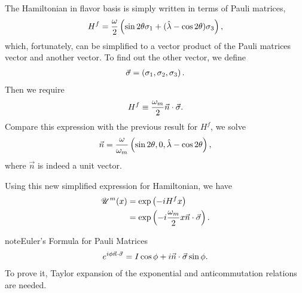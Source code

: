 \documentclass[letterpaper,12pt,english]{sphinxmanual}
\begin{document}
The Hamiltonian in flavor basis is simply written in terms of Pauli matrices,
\begin{gather}
\begin{split}H^f = \frac{\omega}{2} \left( \sin 2\theta \sigma_1 + (\hat\lambda - \cos 2\theta) \sigma_3 \right),\end{split}\notag
\end{gather}
which, fortunately, can be simplified to a vector product of the Pauli matrices vector and another vector. To find out the other vector, we define
\begin{gather}
\begin{split}\vec \sigma = \left( \sigma_1, \sigma_2,\sigma_3 \right).\end{split}\notag
\end{gather}
Then we require
\begin{gather}
\begin{split}H^f \equiv \frac{\omega_m}{2} \vec n\cdot \vec \sigma .\end{split}\notag
\end{gather}
Compare this expression with the previous result for \(H^f\), we solve
\begin{gather}
\begin{split}\vec n = \frac{\omega}{\omega_m } \left( \sin 2\theta ,  0 , \hat\lambda  - \cos 2\theta  \right),\end{split}\notag
\end{gather}
where \(\vec n\) is indeed a unit vector.

Using this new simplified expression for Hamiltonian, we have
\begin{gather}
\begin{split}\mathscr{U}^m (x) &= \exp\left( -i H^f x \right) \\
& = \exp \left( - i \frac{\omega_m}{2} x \vec n\cdot \vec \sigma \right).\end{split}\notag
\end{gather}
\begin{notice}{note}{Euler's Formula for Pauli Matrices}
\begin{gather}
\begin{split}e^{i \phi \vec n \cdot \vec \sigma} = I \cos \phi + i \vec n \cdot \vec \sigma \sin \phi.\end{split}\notag
\end{gather}
To prove it, Taylor expansion of the exponential and anticommutation relations are needed.
\end{notice}
\end{document}
